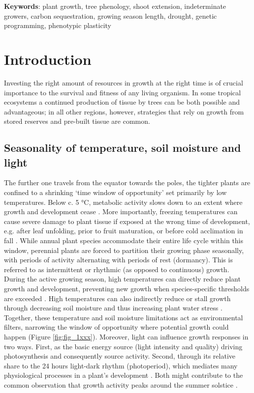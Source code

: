 \documentclass{article}
\begin{document}
			\textbf{Keywords}: plant growth, tree phenology, shoot extension, indeterminate growers, carbon sequestration, growing season length, drought, genetic programming, phenotypic plasticity
			\newpage
			
\section*{Introduction}
		Investing the right amount of resources in growth at the right time is of crucial importance to the survival and fitness of any living organism. In some tropical ecosystems a continued production of tissue by trees can be both possible and advantageous; in all other regions, however, strategies that rely on growth from stored reserves and pre-built tissue are common.

	\subsection*{Seasonality of temperature, soil moisture and light}
		The further one travels from the equator towards the poles, the tighter plants are confined to a shrinking `time window of opportunity' set primarily by low temperatures. Below c. 5 °C, metabolic activity slows down to an extent where growth and development cease  \citep{schenkerPhysiologicalMinimumTemperatures2014, rossiCriticalTemperaturesXylogenesis2008, kornerWinterCropGrowth2008}. More importantly, freezing temperatures can cause severe damage to plant tissue if exposed at the wrong time of development, e.g. after leaf unfolding, prior to fruit maturation, or before cold acclimation in fall \citep{sakaiFreezingInjuriesPlants1987c, baumgartenNoRiskNo2023a}. 
		While annual plant species accommodate their entire life cycle within this window, perennial plants are forced to partition their growing phase seasonally, with periods of activity alternating with periods of rest (dormancy). This is referred to as intermittent or rhythmic (as opposed to continuous) growth. \\

		During the active growing season, high temperatures can directly reduce plant growth and development, preventing new growth when species-specific thresholds are exceeded \citep{osullivanThermalLimitsLeaf2017}. High temperatures can also indirectly reduce or stall growth through decreasing soil moisture and thus increasing plant water stress \citep{hsiaoPlantResponsesWater1973, pugnaireConstraintsWaterStress1999, etzoldNumberGrowthDays2021}. Together, these temperature and soil moisture limitations act as environmental filters, narrowing the window of opportunity where potential growth could happen (Figure \ref{fig:fig_1xxx}). Moreover, light can influence growth responses in two ways. First, as the basic energy source (light intensity and quality) driving photosynthesis and consequently source activity. Second, through its relative share to the 24 hours light-dark rhythm (photoperiod), which mediates many physiological processes in a plant's development \citep{wangPlantsDistinguishDifferent2024b}. Both might contribute to the common observation that growth activity peaks around the summer solstice \citep{rossiConifersColdEnvironments2006, etzoldNumberGrowthDays2021}.
	
\end{document}
